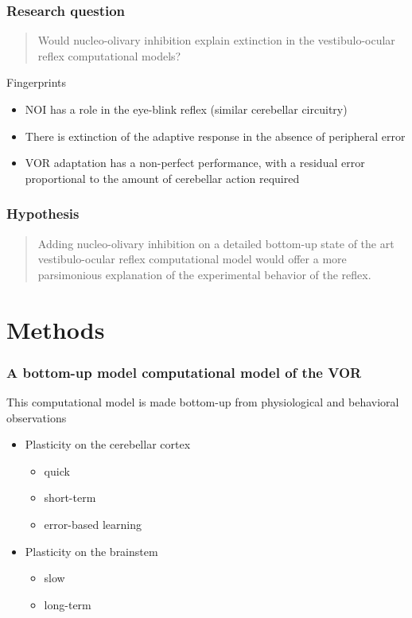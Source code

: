\documentclass[10pt, compress]{beamer}
\begin{document}
\begin{frame}[fragile]
  \frametitle{Research question}
  \begin{quote}
    Would nucleo-olivary inhibition explain extinction in the vestibulo-ocular reflex computational models?
  \end{quote}
  \begin{block}{Fingerprints}
    \begin{itemize}
      \item NOI has a role in the eye-blink reflex (similar cerebellar circuitry) \cite{Herreros2013b}
      \item There is extinction of the adaptive response in the absence of peripheral error
      \item VOR adaptation has a non-perfect performance, with a residual error proportional to the amount of cerebellar action required
    \end{itemize}
  \end{block}
\end{frame}

\begin{frame}[fragile]
  \frametitle{Hypothesis}
  \begin{quote}
    Adding nucleo-olivary inhibition on a detailed bottom-up state of the art vestibulo-ocular reflex computational model would offer a more
    parsimonious explanation of the experimental behavior of the reflex.
  \end{quote}
\end{frame}

\section{Methods}

\begin{frame}[fragile]
  \frametitle{A bottom-up model computational model of the VOR}
  This computational model is made bottom-up from physiological and behavioral observations
  \begin{itemize}
    \item Plasticity on the cerebellar cortex
    \begin{itemize}
      \item quick
      \item short-term
      \item error-based learning
    \end{itemize}
    \item Plasticity on the brainstem
    \begin{itemize}
      \item slow
      \item long-term
    \end{itemize}
  \end{itemize}
  \cite{Clopath2014}
\end{frame}
\end{document}
